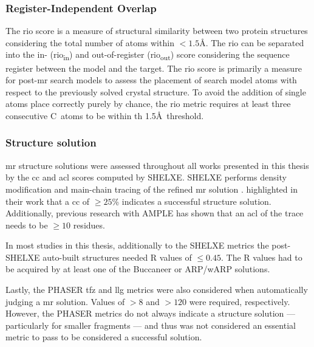 \subsubsection{Register-Independent Overlap}
The \gls{rio} score \cite{Thomas2015-wu} is a measure of structural similarity between two protein structures considering the total number of atoms within $<1.5$\AA. The \gls{rio} can be separated into the in- (\gls{rio}\textsubscript{in}) and out-of-register (\gls{rio}\textsubscript{out}) score considering the sequence register between the model and the target. The \gls{rio} score is primarily a measure for post-\gls{mr} search models to assess the placement of search model atoms with respect to the previously solved crystal structure. To avoid the addition of single atoms place correctly purely by chance, the \gls{rio} metric requires at least three consecutive C\textalpha\ atoms to be within th 1.5\AA\ threshold.

\subsubsection{Structure solution} \label{sec:methods_mr_success}
\gls{mr} structure solutions were assessed throughout all works presented in this thesis by the \gls{cc} \cite{Fujinaga1987-vh} and \gls{acl} scores computed by SHELXE. SHELXE performs density modification and main-chain tracing of the refined \gls{mr} solution \cite{Thorn2013-le}. \textcite{Thorn2013-le} highlighted in their work that a \gls{cc} of $\geq25$\% indicates a successful structure solution. Additionally, previous research with AMPLE \cite{Thomas2015-wu} has shown that an \gls{acl} of the trace needs to be $\geq10$ residues.

In most studies in this thesis, additionally to the SHELXE metrics the post-SHELXE auto-built structures needed R values of $\leq0.45$. The R values had to be acquired by at least one of the Buccaneer \cite{Cowtan2006-xv} or ARP/wARP \cite{Cohen2007-wg} solutions.

Lastly, the PHASER \gls{tfz} and \gls{llg} metrics were also considered when automatically judging a \gls{mr} solution. Values of $>8$ and $>120$ were required, respectively. However, the PHASER metrics do not always indicate a structure solution --- particularly for smaller fragments --- and thus was not considered an essential metric to pass to be considered a successful solution.
